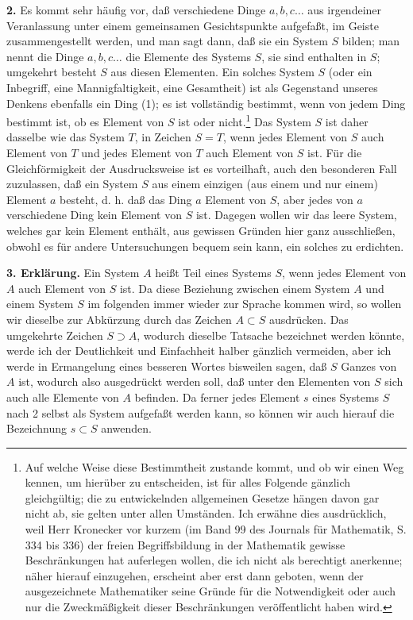\documentclass[11pt]{article}
\newcommand{\partof}{\mathrel{\subset}}
\newcommand{\wholeof}{\mathrel{\supset}}
\begin{document}
\noindent\textbf{2.} Es kommt sehr häufig vor, daß verschiedene Dinge $a,b,c\ldots$ aus irgendeiner Veranlassung unter einem gemeinsamen Gesichtspunkte aufgefaßt, im Geiste zusammengestellt werden, und man sagt dann, daß sie ein System $S$ bilden; man nennt die Dinge $a,b,c\ldots$ die Elemente des Systems $S$, sie sind enthalten in $S$; umgekehrt besteht $S$ aus diesen Elementen. Ein solches System $S$ (oder ein Inbegriff, eine Mannigfaltigkeit, eine Gesamtheit) ist als Gegenstand unseres Denkens ebenfalls ein Ding (1); es ist vollständig bestimmt, wenn von jedem Ding bestimmt ist, ob es Element von $S$ ist oder nicht.\footnote{Auf welche Weise diese Bestimmtheit zustande kommt, und ob wir einen Weg kennen, um hierüber zu entscheiden, ist für alles Folgende gänzlich gleichgültig; die zu entwickelnden allgemeinen Gesetze hängen davon gar nicht ab, sie gelten unter allen Umständen. Ich erwähne dies ausdrücklich, weil Herr Kronecker vor kurzem (im Band 99 des Journals für Mathematik, S. 334 bis 336) der freien Begriffsbildung in der Mathematik gewisse Beschränkungen hat auferlegen wollen, die ich nicht als berechtigt anerkenne; näher hierauf einzugehen, erscheint aber erst dann geboten, wenn der ausgezeichnete Mathematiker seine Gründe für die Notwendigkeit oder auch nur die Zweckmäßigkeit dieser Beschränkungen veröffentlicht haben wird.} Das System $S$ ist daher dasselbe wie das System $T$, in Zeichen $S=T$, wenn jedes Element von $S$ auch Element von $T$ und jedes Element von $T$ auch Element von $S$ ist. Für die Gleichförmigkeit der Ausdrucksweise ist es vorteilhaft, auch den besonderen Fall zuzulassen, daß ein System $S$ aus einem einzigen (aus einem und nur einem) Element $a$ besteht, d. h. daß das Ding $a$ Element von $S$, aber jedes von $a$ verschiedene Ding kein Element von $S$ ist. Dagegen wollen wir das leere System, welches gar kein Element enthält, aus gewissen Gründen hier ganz ausschließen, obwohl es für andere Untersuchungen bequem sein kann, ein solches zu erdichten.

\noindent\textbf{3. Erklärung.} Ein System $A$ heißt Teil eines Systems $S$, wenn jedes Element von $A$ auch Element von $S$ ist. Da diese Beziehung zwischen einem System $A$ und einem System $S$ im folgenden immer wieder zur Sprache kommen wird, so wollen wir dieselbe zur Abkürzung durch das Zeichen $A\partof S$ ausdrücken. Das umgekehrte Zeichen $S\wholeof A$, wodurch dieselbe Tatsache bezeichnet werden könnte, werde ich der Deutlichkeit und Einfachheit halber gänzlich vermeiden, aber ich werde in Ermangelung eines besseren Wortes bisweilen sagen, daß $S$ Ganzes von $A$ ist, wodurch also ausgedrückt werden soll, daß unter den Elementen von $S$ sich auch alle Elemente von $A$ befinden. Da ferner jedes Element $s$ eines Systems $S$ nach 2 selbst als System aufgefaßt werden kann, so können wir auch hierauf die Bezeichnung $s\partof S$ anwenden.
\end{document}
